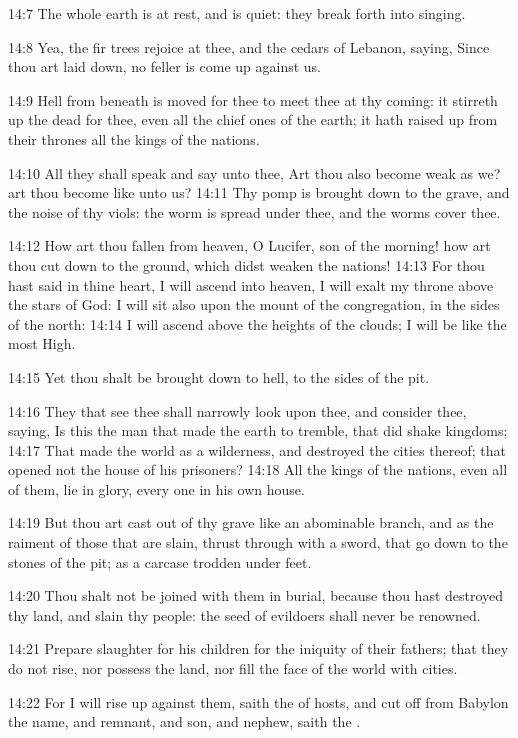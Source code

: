 14:7 The whole earth is at rest, and is quiet: they break forth into singing.

14:8 Yea, the fir trees rejoice at thee, and the cedars of Lebanon, saying, Since thou art laid down, no feller is come up against us.

14:9 Hell from beneath is moved for thee to meet thee at thy coming: it stirreth up the dead for thee, even all the chief ones of the earth; it hath raised up from their thrones all the kings of the nations.

14:10 All they shall speak and say unto thee, Art thou also become weak as we? art thou become like unto us?  14:11 Thy pomp is brought down to the grave, and the noise of thy viols: the worm is spread under thee, and the worms cover thee.

14:12 How art thou fallen from heaven, O Lucifer, son of the morning!  how art thou cut down to the ground, which didst weaken the nations!  14:13 For thou hast said in thine heart, I will ascend into heaven, I will exalt my throne above the stars of God: I will sit also upon the mount of the congregation, in the sides of the north: 14:14 I will ascend above the heights of the clouds; I will be like the most High.

14:15 Yet thou shalt be brought down to hell, to the sides of the pit.

14:16 They that see thee shall narrowly look upon thee, and consider thee, saying, Is this the man that made the earth to tremble, that did shake kingdoms; 14:17 That made the world as a wilderness, and destroyed the cities thereof; that opened not the house of his prisoners?  14:18 All the kings of the nations, even all of them, lie in glory, every one in his own house.

14:19 But thou art cast out of thy grave like an abominable branch, and as the raiment of those that are slain, thrust through with a sword, that go down to the stones of the pit; as a carcase trodden under feet.

14:20 Thou shalt not be joined with them in burial, because thou hast destroyed thy land, and slain thy people: the seed of evildoers shall never be renowned.

14:21 Prepare slaughter for his children for the iniquity of their fathers; that they do not rise, nor possess the land, nor fill the face of the world with cities.

14:22 For I will rise up against them, saith the \LORD of hosts, and cut off from Babylon the name, and remnant, and son, and nephew, saith the \LORD.

